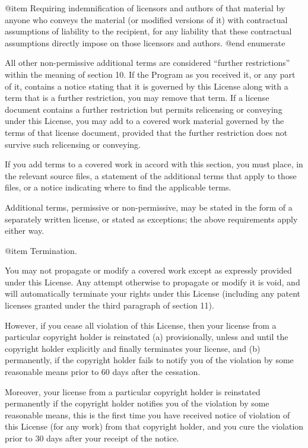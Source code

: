 @item
Requiring indemnification of licensors and authors of that material by
anyone who conveys the material (or modified versions of it) with
contractual assumptions of liability to the recipient, for any
liability that these contractual assumptions directly impose on those
licensors and authors.
@end enumerate

All other non-permissive additional terms are considered ``further
restrictions'' within the meaning of section 10.  If the Program as you
received it, or any part of it, contains a notice stating that it is
governed by this License along with a term that is a further
restriction, you may remove that term.  If a license document contains
a further restriction but permits relicensing or conveying under this
License, you may add to a covered work material governed by the terms
of that license document, provided that the further restriction does
not survive such relicensing or conveying.

If you add terms to a covered work in accord with this section, you
must place, in the relevant source files, a statement of the
additional terms that apply to those files, or a notice indicating
where to find the applicable terms.

Additional terms, permissive or non-permissive, may be stated in the
form of a separately written license, or stated as exceptions; the
above requirements apply either way.

@item Termination.

You may not propagate or modify a covered work except as expressly
provided under this License.  Any attempt otherwise to propagate or
modify it is void, and will automatically terminate your rights under
this License (including any patent licenses granted under the third
paragraph of section 11).

However, if you cease all violation of this License, then your license
from a particular copyright holder is reinstated (a) provisionally,
unless and until the copyright holder explicitly and finally
terminates your license, and (b) permanently, if the copyright holder
fails to notify you of the violation by some reasonable means prior to
60 days after the cessation.

Moreover, your license from a particular copyright holder is
reinstated permanently if the copyright holder notifies you of the
violation by some reasonable means, this is the first time you have
received notice of violation of this License (for any work) from that
copyright holder, and you cure the violation prior to 30 days after
your receipt of the notice.

